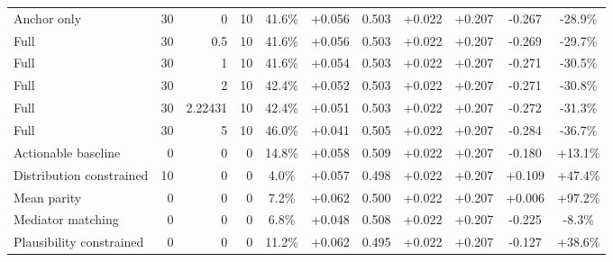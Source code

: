 \begin{table}[htbp]
\begin{tabular}{lrrrccccccc}
Anchor only & 30 & 0 & 10 & 41.6\% & +0.056 & 0.503 & +0.022 & +0.207 & -0.267 & -28.9\% \\
Full & 30 & 0.5 & 10 & 41.6\% & +0.056 & 0.503 & +0.022 & +0.207 & -0.269 & -29.7\% \\
Full & 30 & 1 & 10 & 41.6\% & +0.054 & 0.503 & +0.022 & +0.207 & -0.271 & -30.5\% \\
Full & 30 & 2 & 10 & 42.4\% & +0.052 & 0.503 & +0.022 & +0.207 & -0.271 & -30.8\% \\
Full & 30 & 2.22431 & 10 & 42.4\% & +0.051 & 0.503 & +0.022 & +0.207 & -0.272 & -31.3\% \\
Full & 30 & 5 & 10 & 46.0\% & +0.041 & 0.505 & +0.022 & +0.207 & -0.284 & -36.7\% \\
Actionable baseline & 0 & 0 & 0 & 14.8\% & +0.058 & 0.509 & +0.022 & +0.207 & -0.180 & +13.1\% \\
Distribution constrained & 10 & 0 & 0 & 4.0\% & +0.057 & 0.498 & +0.022 & +0.207 & +0.109 & +47.4\% \\
Mean parity & 0 & 0 & 0 & 7.2\% & +0.062 & 0.500 & +0.022 & +0.207 & +0.006 & +97.2\% \\
Mediator matching & 0 & 0 & 0 & 6.8\% & +0.048 & 0.508 & +0.022 & +0.207 & -0.225 & -8.3\% \\
Plausibility constrained & 0 & 0 & 0 & 11.2\% & +0.062 & 0.495 & +0.022 & +0.207 & -0.127 & +38.6\% \\
\bottomrule
\end{tabular}
\end{table}